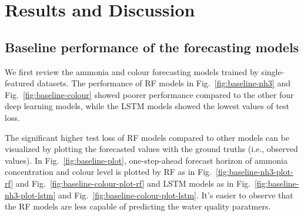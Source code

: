 \chapter{Results and Discussion}
\section{Baseline performance of the forecasting models}
We first review the ammonia and colour forecasting models trained by single-featured datasets. The performance of RF models in Fig.~\ref{fig:baseline-nh3} and Fig.~\ref{fig:baseline-colour} showed poorer performance compared to the other four deep learning models, while the LSTM models showed the lowest values of test loss.

The significant higher test loss of RF models compared to other models can be visualized by plotting the forecasted values with the ground truths (i.e., observed values). In Fig.~\ref{fig:baseline-plot}, one-step-ahead forecast horizon of ammonia concentration and colour level is plotted by RF as in Fig.~\ref{fig:baseline-nh3-plot-rf} and Fig.~\ref{fig:baseline-colour-plot-rf} and LSTM models as in Fig.~\ref{fig:baseline-nh3-plot-lstm} and Fig.~\ref{fig:baseline-colour-plot-lstm}. It's easier to observe that the RF models are less capable of predicting the water quality paratmers. 

